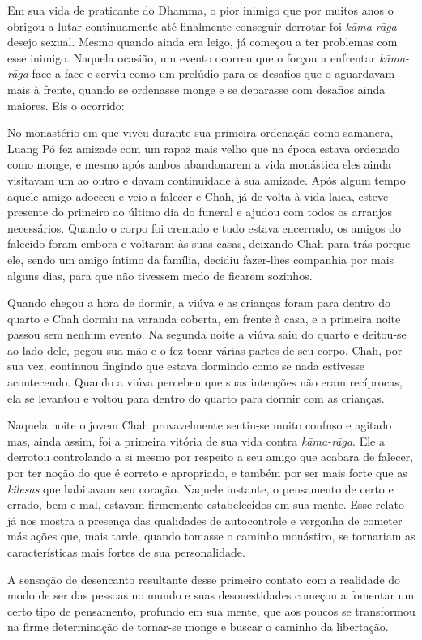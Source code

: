Em sua vida de praticante do Dhamma, o pior inimigo que por muitos anos
o obrigou a lutar continuamente até finalmente conseguir derrotar foi
\emph{kāma-rāga} -- desejo sexual. Mesmo quando ainda era leigo, já
começou a ter problemas com esse inimigo. Naquela ocasião, um evento
ocorreu que o forçou a enfrentar \emph{kāma-rāga} face a face e serviu
como um prelúdio para os desafios que o aguardavam mais à frente, quando
se ordenasse monge e se deparasse com desafios ainda maiores. Eis o
ocorrido:

No monastério em que viveu durante sua primeira ordenação como sāmanera,
Luang Pó fez amizade com um rapaz mais velho que na época estava
ordenado como monge, e mesmo após ambos abandonarem a vida monástica
eles ainda visitavam um ao outro e davam continuidade à sua amizade.
Após algum tempo aquele amigo adoeceu e veio a falecer e Chah, já de
volta à vida laica, esteve presente do primeiro ao último dia do funeral
e ajudou com todos os arranjos necessários. Quando o corpo foi cremado e
tudo estava encerrado, os amigos do falecido foram embora e voltaram às
suas casas, deixando Chah para trás porque ele, sendo um amigo íntimo da
família, decidiu fazer-lhes companhia por mais alguns dias, para que não
tivessem medo de ficarem sozinhos.

Quando chegou a hora de dormir, a viúva e as crianças foram para dentro
do quarto e Chah dormiu na varanda coberta, em frente à casa, e a
primeira noite passou sem nenhum evento. Na segunda noite a viúva saiu
do quarto e deitou-se ao lado dele, pegou sua mão e o fez tocar várias
partes de seu corpo. Chah, por sua vez, continuou fingindo que estava
dormindo como se nada estivesse acontecendo. Quando a viúva percebeu que
suas intenções não eram recíprocas, ela se levantou e voltou para dentro
do quarto para dormir com as crianças.

Naquela noite o jovem Chah provavelmente sentiu-se muito confuso e
agitado mas, ainda assim, foi a primeira vitória de sua vida contra
\emph{kāma-rāga}. Ele a derrotou controlando a si mesmo por respeito a
seu amigo que acabara de falecer, por ter noção do que é correto e
apropriado, e também por ser mais forte que as \emph{kilesas} que
habitavam seu coração. Naquele instante, o pensamento de certo e errado,
bem e mal, estavam firmemente estabelecidos em sua mente. Esse relato já
nos mostra a presença das qualidades de autocontrole e vergonha de
cometer más ações que, mais tarde, quando tomasse o caminho monástico,
se tornariam as características mais fortes de sua personalidade.

A sensação de desencanto resultante desse primeiro contato com a
realidade do modo de ser das pessoas no mundo e suas desonestidades
começou a fomentar um certo tipo de pensamento, profundo em sua mente,
que aos poucos se transformou na firme determinação de tornar-se monge e
buscar o caminho da libertação.

